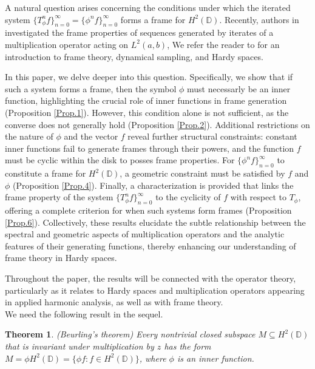 \documentclass[12pt,titlepage]{amsart}
\newtheorem{thm}{Theorem}[section]
\theoremstyle{definition}
\theoremstyle{remark}
\begin{document}
A natural question arises concerning the conditions under which
the iterated system $\{ T_\phi^n f \}_{n=0}^\infty = \{ \phi^n f
\}_{n=0}^\infty$ forms a frame for $H^2(\mathbb{D})$. Recently,
authors in \cite{Kasumov.2019} investigated the frame properties
of sequences generated by iterates of a multiplication operator
acting on $L^2(a,b)$, We refer the reader to \cite{Christensen,
Aldroubi.2018,Douglas,Duren} for an introduction to frame theory,
dynamical sampling, and Hardy spaces.

In this paper, we delve deeper into this question. Specifically,
we show that if such a system forms a frame, then the symbol
$\phi$ must necessarly be an inner function, highlighting the
crucial role of inner functions in frame generation (Proposition
\ref{Prop.1}). However, this condition alone is not sufficient, as
the converse does not generally hold (Proposition \ref{Prop.2}).
Additional restrictions on the nature of $\phi$ and the vector $f$
reveal further structural constraints: constant inner functions
fail to generate frames through their powers, and the function $f$
must be cyclic within the disk to posses frame properties. For $\{
\phi^n f \}_{n=0}^\infty$ to constitute a frame for
$H^2(\mathbb{D})$, a geometric constraint must be satisfied by $f$
and $\phi$ (Proposition \ref{Prop.4}). Finally, a characterization
is provided that links the frame property of the system $\{
T_\phi^n f \}_{n=0}^\infty$ to the cyclicity of $f$ with respect
to $T_\phi$, offering a complete criterion for when such systems
form frames (Proposition \ref{Prop.6}). Collectively, these
results elucidate the subtle relationship between the spectral and
geometric aspects of multiplication operators and the analytic
features of their generating functions, thereby enhancing our
understanding of frame theory in Hardy spaces.

Throughout the paper, the results will be connected with the
operator theory, particularly as it relates to Hardy spaces and
multiplication operators appearing in applied harmonic analysis,
as well as with frame theory.\\

We need the following result in the sequel.
\begin{thm} (Beurling's theorem) \cite[Theorem 4.3, page
89]{Duren}\label{thm.1} Every nontrivial closed subspace
$M\subseteq H^2(\mathbb{D})$ that is invariant under
multiplication by $z$ has the form $M=\phi H^2(\mathbb{D})=\{\phi
f: f \in H^2(\mathbb{D})\}$, where $\phi$ is an inner function.
\end{thm}
\end{document}
